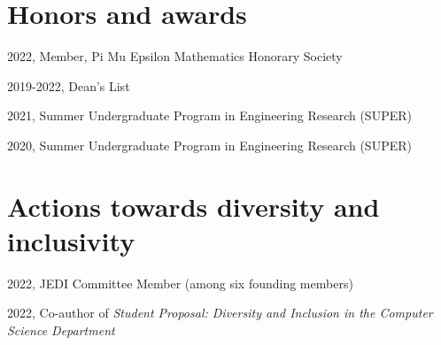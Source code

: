 \documentclass[letterpaper]{article}
\renewenvironment{itemize}{
  \begin{list}{}{
    \setlength{\leftmargin}{1.5em}
  }
}{
  \end{list}
}
\begin{document}
\section*{Honors and awards}

\begin{itemize}
\item 2022, Member, Pi Mu Epsilon Mathematics Honorary Society
\item 2019-2022, Dean's List
\item 2021, Summer Undergraduate Program in Engineering Research (SUPER)
\item 2020, Summer Undergraduate Program in Engineering Research (SUPER)
\end{itemize}


\section*{Actions towards diversity and inclusivity}
\begin{itemize}
\item 
2022, JEDI Committee Member (among six founding members)

\item
2022, Co-author of \emph{Student Proposal: Diversity and Inclusion in the Computer Science Department}
\end{itemize}
\end{document}
